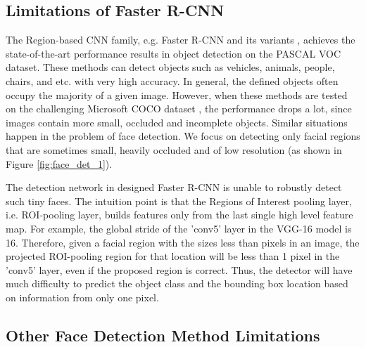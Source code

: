 \documentclass[10pt,journal,cspaper,compsoc]{IEEEtran}
\begin{document}
\subsection{Limitations of Faster R-CNN}

The Region-based CNN family, e.g. Faster R-CNN and its variants \cite{girshick2015fast}, achieves the state-of-the-art performance results in object detection on the PASCAL VOC dataset. These methods can detect objects such as vehicles, animals, people, chairs, and etc. with very high accuracy.
In general, the defined objects often occupy the majority of a given image. However, when these methods are tested on the challenging Microsoft COCO dataset \cite{lin2014microsoft}, the performance drops a lot, since images contain more small, occluded and incomplete objects. Similar situations happen in the problem of face detection. We focus on detecting only facial regions that are sometimes small, heavily occluded and of low resolution (as shown in Figure \ref{fig:face_det_1}).

The detection network in designed Faster R-CNN is unable to robustly detect such tiny faces. The intuition point is that the Regions of Interest pooling layer, i.e. ROI-pooling layer, builds features only from the last single high level feature map.
For example, the global stride of the 'conv5' layer in the VGG-16 model is 16. Therefore, given a facial region with the sizes less than  pixels in an image, the projected ROI-pooling region for that location will be less than 1 pixel in the 'conv5' layer, even if the proposed region is correct. Thus, the detector will have much difficulty to predict the object class and the bounding box location based on information from only one pixel.








\subsection{Other Face Detection Method Limitations}
\end{document}
